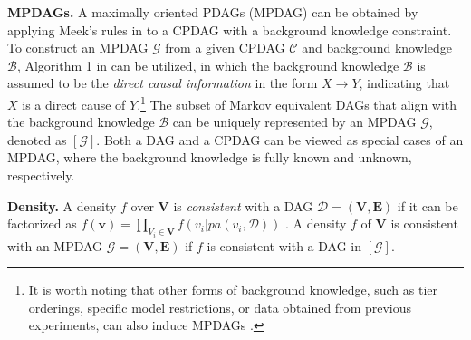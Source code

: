 \documentclass{article} %
\begin{document}
\textbf{MPDAGs.} A maximally oriented PDAGs (MPDAG) \citep{meek1995causal} can be obtained by applying Meek's rules in \citet{meek1995causal} to a CPDAG with a background knowledge constraint. To construct an MPDAG $\mathcal{G}$ from a given CPDAG $\mathcal{C}$ and background knowledge $\mathcal{B}$, Algorithm 1 in \citet{perkovic2017interpreting} can be utilized, in which the background knowledge $\mathcal{B}$ is assumed to be the \textit{direct causal information} in the form $X \rightarrow Y$, indicating that $X$ is a direct cause of $Y$.\footnote{It is worth noting that other forms of background knowledge, such as tier orderings, specific model restrictions, or data obtained from previous experiments, can also induce MPDAGs \cite{scheines1998tetrad, hoyer2012causal, hauser2012characterization, eigenmann2017structure, wang2017permutation, rothenhausler2018causal}.}
The subset of Markov equivalent DAGs that align with the background knowledge $\mathcal{B}$ can be uniquely represented by an MPDAG $\mathcal{G}$, denoted as $[\mathcal{G}]$. Both a DAG and a CPDAG can be viewed as special cases of an MPDAG, where the background knowledge is fully known and unknown, respectively.


\textbf{Density.} A density $f$ over $\mathbf{V}$ is \textit{consistent} with a DAG $\mathcal{D}=(\mathbf{V}, \mathbf{E})$ if it can be factorized as $f(\mathbf{v})=\prod_{V_i \in \mathbf{V}} f(v_i | pa(v_i, \mathcal{D}))$ \citep{pearl2009causality, perkovic2017interpreting}. A density $f$ of $\mathbf{V}$ is consistent with an MPDAG $\mathcal{G}=(\mathbf{V}, \mathbf{E})$ if $f$ is consistent with a DAG in $[\mathcal{G}]$.


\end{document}

